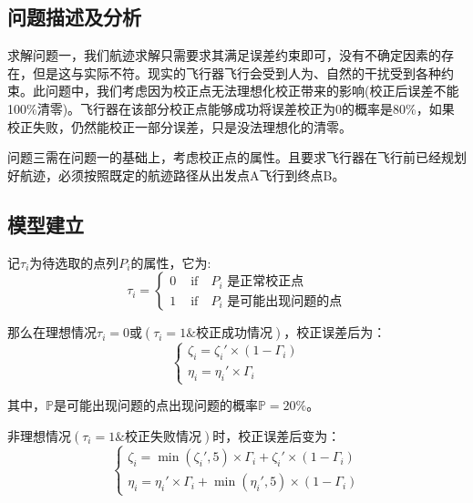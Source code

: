 \subsection{问题描述及分析}
求解问题一，我们航迹求解只需要求其满足误差约束即可，没有不确定因素的存在，但是这与实际不符。现实的飞行器飞行会受到人为、自然的干扰受到各种约束。此问题中，我们考虑因为校正点无法理想化校正带来的影响(校正后误差不能100\%清零)。飞行器在该部分校正点能够成功将误差校正为0的概率是80\%，如果校正失败，仍然能校正一部分误差，只是没法理想化的清零。

问题三需在问题一的基础上，考虑校正点的属性。且要求飞行器在飞行前已经规划好航迹，必须按照既定的航迹路径从出发点A飞行到终点B。

\subsection{模型建立}
记$\tau_i$为待选取的点列$P_i$的属性，它为:
\begin{equation}\label{eq:label}
    \tau_i = \begin{cases}
    0 & \text{ if} \quad P_i \text{ 是正常校正点 } \\ 
    1 & \text{ if} \quad P_i   \text{ 是可能出现问题的点} 
    \end{cases}
\end{equation}

那么在理想情况$\tau_i = 0$或$(\tau_i = 1 \& \text{校正成功情况} )$，校正误差后为：
\begin{equation}
    \left\{\begin{matrix}
        \zeta_{i} = \zeta_{i}' \times (1- \Gamma_{i} )  \\
        \eta_{i} = \eta_{i}' \times \Gamma_{i}
    \end{matrix}\right.
    \end{equation}

其中，$ \mathbb{P} $是可能出现问题的点出现问题的概率$\mathbb{P} = 20 \%$。

非理想情况$(\tau_i = 1 \& \text{校正失败情况})$时，校正误差后变为：
\begin{equation}\label{eq:sibai}
    \left\{\begin{matrix}
        \zeta_{i} = \min (\zeta_{i}' ,5) \times  \Gamma_{i} + \zeta_{i}'\times  (1-\Gamma_{i})\\
        \eta_{i} = \eta_{i}' \times  \Gamma_{i} + \min (\eta_{i}' ,5)\times (1- \Gamma_{i})
    \end{matrix}\right. 
\end{equation}

